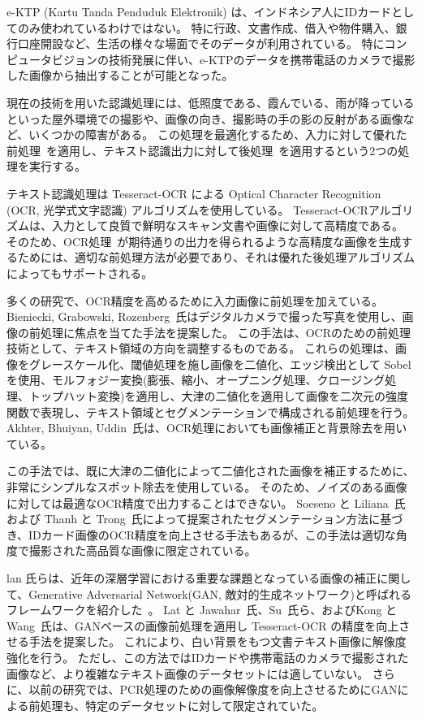 \documentclass[uplatex, twocolumn,10pt]{jsarticle}
\begin{document}
e-KTP (Kartu Tanda Penduduk Elektronik) は、インドネシア人にIDカードとしてのみ使われているわけではない。
特に行政、文書作成、借入や物件購入、銀行口座開設など、生活の様々な場面でそのデータが利用されている。
特にコンピュータビジョンの技術発展に伴い、e-KTPのデータを携帯電話のカメラで撮影した画像から抽出することが可能となった。

現在の技術を用いた認識処理には、低照度である、霞んでいる、雨が降っているといった屋外環境での撮影や、画像の向き、撮影時の手の影の反射がある画像など、いくつかの障害がある。
この処理を最適化するため、入力に対して優れた前処理~\cite{bib1}を適用し、テキスト認識出力に対して後処理~\cite{bib2}を適用するという2つの処理を実行する。

テキスト認識処理は Tesseract-OCR による Optical Character Recognition (OCR, 光学式文字認識) アルゴリズムを使用している。
Tesseract-OCRアルゴリズムは、入力として良質で鮮明なスキャン文書や画像に対して高精度である。
そのため、OCR処理~\cite{bib1}が期待通りの出力を得られるような高精度な画像を生成するためには、適切な前処理方法が必要であり、それは優れた後処理アルゴリズムによってもサポートされる。

多くの研究で、OCR精度を高めるために入力画像に前処理を加えている。
Bieniecki, Grabowski, Rozenberg~\cite{bib1}氏はデジタルカメラで撮った写真を使用し、画像の前処理に焦点を当てた手法を提案した。
この手法は、OCRのための前処理技術として、テキスト領域の方向を調整するものである。
これらの処理は、画像をグレースケール化、閾値処理を施し画像を二値化、エッジ検出として Sobel を使用、モルフォジー変換(膨張、縮小、オープニング処理、クロージング処理、トップハット変換)を適用し、大津の二値化を適用して画像を二次元の強度関数で表現し、テキスト領域とセグメンテーションで構成される前処理を行う。
Akhter, Bhuiyan, Uddin~\cite{bib5}氏は、OCR処理においても画像補正と背景除去を用いている。

この手法では、既に大津の二値化によって二値化された画像を補正するために、非常にシンプルなスポット除去を使用している。
そのため、ノイズのある画像に対しては最適なOCR精度で出力することはできない。
Soeseno と Liliana~\cite{bib6}氏 および Thanh と Trong~\cite{bib7}氏によって提案されたセグメンテーション方法に基づき、IDカード画像のOCR精度を向上させる手法もあるが、この手法は適切な角度で撮影された高品質な画像に限定されている。

lan 氏らは、近年の深層学習における重要な課題となっている画像の補正に関して、Generative Adversarial Network(GAN, 敵対的生成ネットワーク)と呼ばれるフレームワークを紹介した~\cite{bib8}。
Lat と Jawahar~\cite{bib9}氏、Su~\cite{bib10}氏ら、およびKong と Wang~\cite{bib11}氏は、GANベースの画像前処理を適用し Tesseract-OCR の精度を向上させる手法を提案した。
これにより、白い背景をもつ文書テキスト画像に解像度強化を行う。
ただし、この方法ではIDカードや携帯電話のカメラで撮影された画像など、より複雑なテキスト画像のデータセットには適していない。
さらに、以前の研究では、PCR処理のための画像解像度を向上させるためにGANによる前処理も、特定のデータセットに対して限定されていた。
\end{document}
